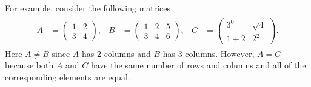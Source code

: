 \documentclass[letterpaper,10pt,english]{jupyterBook}
\begin{document}
\sphinxAtStartPar
For example, consider the following matrices
\begin{equation*}
\begin{split} \begin{align*}
    A &= \begin{pmatrix} 1 & 2 \\ 3 & 4 \end{pmatrix}, &
    B &= \begin{pmatrix} 1 & 2 & 5 \\ 3 & 4 & 6 \end{pmatrix}, &
    C &= \begin{pmatrix} 3^0 & \sqrt{4} \\ 1 + 2 & 2^2 \end{pmatrix}.
\end{align*} \end{split}
\end{equation*}
\sphinxAtStartPar
Here \(A \neq B\) since \(A\) has 2 columns and \(B\) has 3 columns. However, \(A=C\) because both \(A\) and \(C\) have the same number of rows and columns and all of the corresponding elements are equal.

\ignorespaces 
\end{document}
